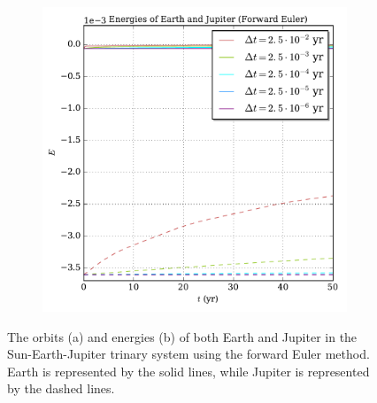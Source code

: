 \documentclass[prb,aps,twocolumn,showpacs,10pt]{revtex4-1}
\begin{document}
\begin{figure}
\begin{subfigure}{.5\textwidth}
  \includegraphics[width=\linewidth]{trinary_fixed_euler_energy.pdf}
  \label{fig:sub2}
\end{subfigure}
\caption{The orbits (a) and energies (b) of both Earth and Jupiter in the Sun-Earth-Jupiter trinary system using the forward Euler method. Earth is represented by the solid lines, while Jupiter is represented by the dashed lines.}
\label{fig:test}
\end{figure}
\end{document}
